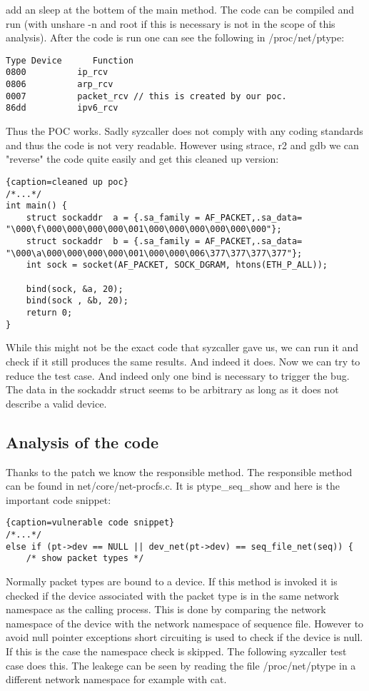 \documentclass[10pt,twocolumn,a4paper]{article}
\begin{document}
add an sleep at the bottem of the main method. The code can be compiled and run (with unshare -n and root if this
is necessary is not in the scope of this analysis). After the code is run one can see the following
in /proc/net/ptype:
\begin{lstlisting}
Type Device      Function
0800          ip_rcv
0806          arp_rcv
0007          packet_rcv // this is created by our poc.
86dd          ipv6_rcv
\end{lstlisting}
Thus the POC works. Sadly syzcaller does not comply with any coding standards and thus the code is
not very readable. However using strace, r2\cite{29} and gdb\cite{28} we can "reverse" the code quite easily and get this
cleaned up version:
\begin{lstlisting}{caption=cleaned up poc}
/*...*/
int main() {
    struct sockaddr  a = {.sa_family = AF_PACKET,.sa_data= "\000\f\000\000\000\000\001\000\000\000\000\000\000"};
    struct sockaddr  b = {.sa_family = AF_PACKET,.sa_data= "\000\a\000\000\000\000\001\000\000\006\377\377\377\377"};
    int sock = socket(AF_PACKET, SOCK_DGRAM, htons(ETH_P_ALL));

    bind(sock, &a, 20);
    bind(sock , &b, 20);
    return 0;
}
\end{lstlisting}
While this might not be the exact code that syzcaller gave us, we can run it and check if it still
produces the same results. And indeed it does. Now we can try to reduce the test case. And indeed
only one bind is necessary to trigger the bug. The data in the sockaddr struct seems to be arbitrary
as long as it does not describe a valid device. 
\subsection{Analysis of the code}
Thanks to the patch we know the responsible method.
The responsible method can be found in net/core/net-procfs.c. It is ptype\_seq\_show
and here is the important code snippet:
\begin{lstlisting}{caption=vulnerable code snippet}
/*...*/
else if (pt->dev == NULL || dev_net(pt->dev) == seq_file_net(seq)) {
    /* show packet types */
\end{lstlisting}
Normally packet types are bound to a device. If this method is invoked it is checked if the device
associated with the packet type is in the same network namespace as the calling process. This is
done by comparing the network namespace of the device with the network namespace of sequence file.
However to avoid null pointer exceptions short circuiting is used to check if the device is null. If
this is the case the namespace check is skipped. The following syzcaller test case does this.
The leakege can be seen by reading the file /proc/net/ptype in a different network namespace for
example with cat.
\end{document}
